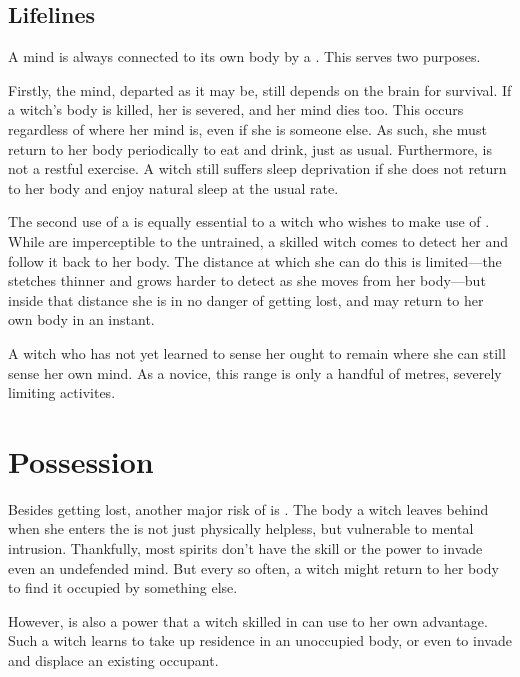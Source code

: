 \subsection{Lifelines}

A mind is always connected to its own body by a {\lifeline}.
This {\lifeline} serves two purposes.

Firstly, the mind, departed as it may be, still depends on the brain for survival.
If a witch's body is killed, her {\lifeline} is severed, and her mind dies too.
This occurs regardless of where her mind is, even if she is {\possessing} someone else.
As such, she must return to her body periodically to eat and drink, just as usual.
Furthermore,  is not a restful exercise.
A witch still suffers sleep deprivation if she does not return to her body and enjoy natural sleep at the usual rate.

The second use of a {\lifeline} is equally essential to a witch who wishes to make use of .
While {\lifelines} are imperceptible to the untrained, a skilled witch comes to detect her {\lifeline} and follow it back to her body.
The distance at which she can do this is limited---the {\lifeline} stetches thinner and grows harder to detect as she moves from her body---but inside that distance she is in no danger of getting lost, and may return to her own body in an instant.

A witch who has not yet learned to sense her {\lifeline} ought to remain where she can still sense her own mind.
As a novice, this range is only a handful of metres, severely limiting activites.

\section{Possession}

Besides getting lost, another major risk of  is {\possession}.
The body a witch leaves behind when she enters the {\mentalrealm} is not just physically helpless, but vulnerable to mental intrusion.
Thankfully, most spirits don't have the skill or the power to invade even an undefended mind.
But every so often, a witch might return to her body to find it occupied by something else.

However, {\possession} is also a power that a witch skilled in  can use to her own advantage.
Such a witch learns to take up residence in an unoccupied body, or even to invade and displace an existing occupant.

